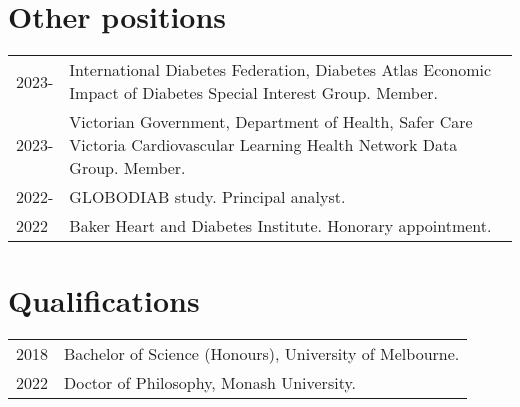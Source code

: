 \documentclass[11pt]{article}
\begin{document}
\section*{Other positions}
\begin{tabular}{p{2cm}p{14cm}}
2023- & International Diabetes Federation, Diabetes Atlas Economic Impact of Diabetes Special Interest Group. Member. \\
2023- & Victorian Government, Department of Health, 
Safer Care Victoria Cardiovascular Learning Health Network Data Group. Member. \\
2022- & GLOBODIAB study. Principal analyst.  \\
2022 & Baker Heart and Diabetes Institute. Honorary appointment.  \\
\end{tabular}

\section*{Qualifications}
\begin{tabular}{p{2cm}p{14cm}}
2018 & Bachelor of Science (Honours), University of Melbourne. \\
2022 & Doctor of Philosophy, Monash University. \\
\end{tabular}

\end{document}
